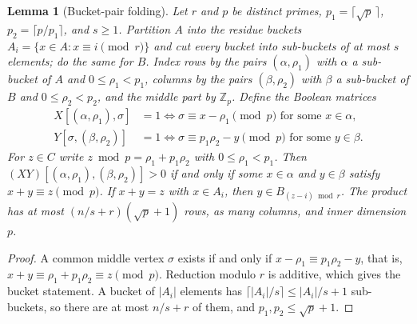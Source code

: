 \documentclass[11pt]{article}
\newtheorem{lemma}[theorem]{Lemma}
\begin{document}
\begin{lemma}[Bucket-pair folding]
\label{lem:bucket}
Let $r$ and $p$ be distinct primes, $p_1=\lceil\sqrt p\,\rceil$,
$p_2=\lceil p/p_1\rceil$, and $s\ge1$. Partition $A$ into the residue
buckets $A_i=\{x\in A:x\equiv i\pmod r\}$ and cut every bucket into
sub-buckets of at most $s$ elements; do the same for $B$. Index rows by the
pairs $(\alpha,\rho_1)$ with $\alpha$ a sub-bucket of $A$ and
$0\le\rho_1<p_1$, columns by the pairs $(\beta,\rho_2)$ with $\beta$ a
sub-bucket of $B$ and $0\le\rho_2<p_2$, and the middle part by $\mathbb Z_p$.
Define the Boolean matrices
\begin{align*}
X[(\alpha,\rho_1),\sigma]&=1\iff\sigma\equiv x-\rho_1\pmod p
\text{ for some }x\in\alpha,\\
Y[\sigma,(\beta,\rho_2)]&=1\iff\sigma\equiv p_1\rho_2-y\pmod p
\text{ for some }y\in\beta.
\end{align*}
For $z\in C$ write $z\bmod p=\rho_1+p_1\rho_2$ with $0\le\rho_1<p_1$. Then
$(XY)[(\alpha,\rho_1),(\beta,\rho_2)]>0$ if and only if some $x\in\alpha$ and
$y\in\beta$ satisfy $x+y\equiv z\pmod p$. If $x+y=z$ with $x\in A_i$, then
$y\in B_{(z-i)\bmod r}$. The product has at most $(n/s+r)(\sqrt p+1)$ rows,
as many columns, and inner dimension $p$.
\end{lemma}
\begin{proof}
A common middle vertex $\sigma$ exists if and only if
$x-\rho_1\equiv p_1\rho_2-y$, that is, $x+y\equiv\rho_1+p_1\rho_2\equiv z
\pmod p$. Reduction modulo $r$ is additive, which gives the bucket statement.
A bucket of $|A_i|$ elements has $\lceil|A_i|/s\rceil\le|A_i|/s+1$
sub-buckets, so there are at most $n/s+r$ of them, and
$p_1,p_2\le\sqrt p+1$.
\end{proof}
\end{document}

